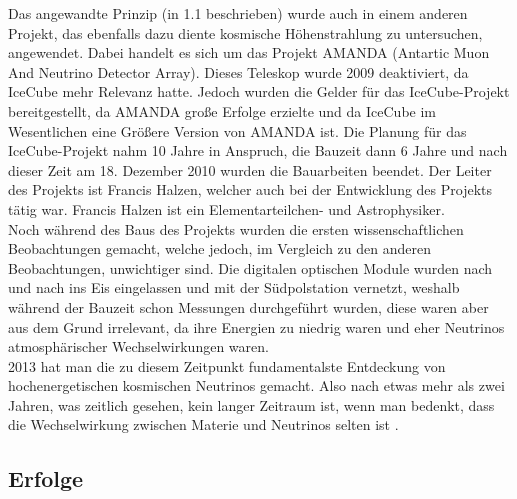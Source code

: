     Das angewandte Prinzip (in 1.1 beschrieben) wurde auch in einem anderen Projekt, 
    das ebenfalls dazu diente kosmische Höhenstrahlung zu untersuchen, angewendet. 
    Dabei handelt es sich um das Projekt AMANDA (Antartic Muon And Neutrino Detector Array). 
    Dieses Teleskop wurde 2009 deaktiviert, da IceCube mehr Relevanz hatte. Jedoch wurden 
    die Gelder für das IceCube-Projekt bereitgestellt, da AMANDA große Erfolge erzielte und da 
    IceCube im Wesentlichen eine Größere Version von AMANDA ist. Die Planung für das 
    IceCube-Projekt nahm 10 Jahre in Anspruch, die Bauzeit dann 6 Jahre und nach dieser 
    Zeit am 18. Dezember 2010 wurden die Bauarbeiten beendet. Der Leiter des Projekts ist 
    Francis Halzen, welcher auch bei der Entwicklung des Projekts tätig war. 
    Francis Halzen ist ein Elementarteilchen- und Astrophysiker. \\
    Noch während des Baus des Projekts wurden die ersten wissenschaftlichen Beobachtungen 
    gemacht, welche jedoch, im Vergleich zu den anderen Beobachtungen, unwichtiger sind. 
    Die digitalen optischen Module wurden nach und nach ins Eis eingelassen und mit der 
    Südpolstation vernetzt, weshalb während der Bauzeit schon Messungen durchgeführt wurden, 
    diese waren aber aus dem Grund irrelevant, da ihre Energien zu niedrig waren und eher 
    Neutrinos atmosphärischer Wechselwirkungen waren. \\
    2013 hat man die zu diesem Zeitpunkt fundamentalste Entdeckung von hochenergetischen 
    kosmischen Neutrinos gemacht. Also nach etwas mehr als zwei Jahren, was zeitlich gesehen, 
    kein langer Zeitraum ist, wenn man bedenkt, dass die Wechselwirkung zwischen Materie und 
    Neutrinos selten ist \cite{FAQ13}.

    \subsection{Erfolge}

